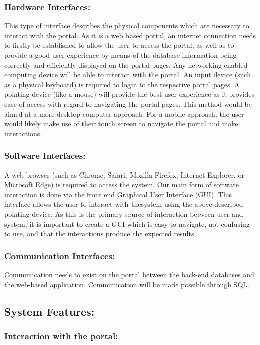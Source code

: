 \documentclass[paper=a4, fontsize=11pt]{scrartcl}
\numberwithin{equation}{section}		%
\numberwithin{figure}{section}			%
\numberwithin{table}{section}				%
\begin{document}
\subsubsection{Hardware Interfaces:}
This type of interface describes the physical components which are necessary to interact
with the portal. As it is a web based portal, an internet connection needs to firstly be
established to allow the user to access the portal, as well as to provide a good user
experience by means of the database information being correctly and efficiently displayed on
the portal pages. Any networking-enabled computing device will be able to interact with the
portal. An input device (such as a physical keyboard) is required to login to the respective
portal pages. A pointing device (like a mouse) will provide the best user experience as it
provides ease of access with regard to navigating the portal pages. This method would be
aimed at a more desktop computer approach. For a mobile approach, the user would likely
make use of their touch screen to navigate the portal and make interactions.

\subsubsection{Software Interfaces:}
A web browser (such as Chrome, Safari, Mozilla Firefox, Internet Explorer, or Microsoft
Edge) is required to access the system. Our main form of software interaction is done via the
front end Graphical User Interface (GUI). This interface allows the user to interact with thesystem using the above described pointing device. As this is the primary source of
interaction between user and system, it is important to create a GUI which is easy to
navigate, not confusing to use, and that the interactions produce the expected results.

\subsubsection{Communication Interfaces:}
Communication needs to exist on the portal between the back-end databases and the
web-based application. Communication will be made possible through SQL.
\\
\subsection{System Features:}
\subsubsection{Interaction with the portal:}
\end{document}
